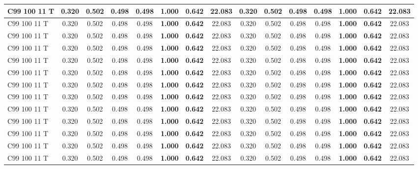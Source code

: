 \documentclass{article}
\begin{document}
\begin{longtable}[c]{|l|c|c|c|c|c|c|c||c|c|c|c|c|c|c|}
C99 100 11 T & 0.320 & 0.502 & 0.498 & 0.498 & \textbf{1.000} & \textbf{0.642} & 22.083 & 0.320 & 0.502 & 0.498 & 0.498 & \textbf{1.000} & \textbf{0.642} & 22.083\\ \hline
C99 100 11 T & 0.320 & 0.502 & 0.498 & 0.498 & \textbf{1.000} & \textbf{0.642} & 22.083 & 0.320 & 0.502 & 0.498 & 0.498 & \textbf{1.000} & \textbf{0.642} & 22.083\\ \hline
C99 100 11 T & 0.320 & 0.502 & 0.498 & 0.498 & \textbf{1.000} & \textbf{0.642} & 22.083 & 0.320 & 0.502 & 0.498 & 0.498 & \textbf{1.000} & \textbf{0.642} & 22.083\\ \hline
C99 100 11 T & 0.320 & 0.502 & 0.498 & 0.498 & \textbf{1.000} & \textbf{0.642} & 22.083 & 0.320 & 0.502 & 0.498 & 0.498 & \textbf{1.000} & \textbf{0.642} & 22.083\\ \hline
C99 100 11 T & 0.320 & 0.502 & 0.498 & 0.498 & \textbf{1.000} & \textbf{0.642} & 22.083 & 0.320 & 0.502 & 0.498 & 0.498 & \textbf{1.000} & \textbf{0.642} & 22.083\\ \hline
C99 100 11 T & 0.320 & 0.502 & 0.498 & 0.498 & \textbf{1.000} & \textbf{0.642} & 22.083 & 0.320 & 0.502 & 0.498 & 0.498 & \textbf{1.000} & \textbf{0.642} & 22.083\\ \hline
C99 100 11 T & 0.320 & 0.502 & 0.498 & 0.498 & \textbf{1.000} & \textbf{0.642} & 22.083 & 0.320 & 0.502 & 0.498 & 0.498 & \textbf{1.000} & \textbf{0.642} & 22.083\\ \hline
C99 100 11 T & 0.320 & 0.502 & 0.498 & 0.498 & \textbf{1.000} & \textbf{0.642} & 22.083 & 0.320 & 0.502 & 0.498 & 0.498 & \textbf{1.000} & \textbf{0.642} & 22.083\\ \hline
C99 100 11 T & 0.320 & 0.502 & 0.498 & 0.498 & \textbf{1.000} & \textbf{0.642} & 22.083 & 0.320 & 0.502 & 0.498 & 0.498 & \textbf{1.000} & \textbf{0.642} & 22.083\\ \hline
C99 100 11 T & 0.320 & 0.502 & 0.498 & 0.498 & \textbf{1.000} & \textbf{0.642} & 22.083 & 0.320 & 0.502 & 0.498 & 0.498 & \textbf{1.000} & \textbf{0.642} & 22.083\\ \hline
C99 100 11 T & 0.320 & 0.502 & 0.498 & 0.498 & \textbf{1.000} & \textbf{0.642} & 22.083 & 0.320 & 0.502 & 0.498 & 0.498 & \textbf{1.000} & \textbf{0.642} & 22.083\\ \hline
C99 100 11 T & 0.320 & 0.502 & 0.498 & 0.498 & \textbf{1.000} & \textbf{0.642} & 22.083 & 0.320 & 0.502 & 0.498 & 0.498 & \textbf{1.000} & \textbf{0.642} & 22.083\\ \hline
C99 100 11 T & 0.320 & 0.502 & 0.498 & 0.498 & \textbf{1.000} & \textbf{0.642} & 22.083 & 0.320 & 0.502 & 0.498 & 0.498 & \textbf{1.000} & \textbf{0.642} & 22.083\\ \hline

\end{longtable}
\end{document}
